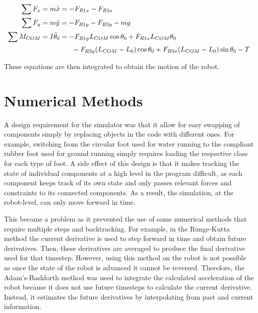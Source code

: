\documentclass[letterpaper]{article}
\begin{document}
\begin{align}
	\sum F_x &= m \ddot{x} = -F_{R1x} - F_{R3x}  \\
	\sum F_y &= m \ddot{y} = -F_{R1y} - F_{R3y} - mg \\
	\sum M_{COM} &= I \ddot{\theta}_0 = -F_{R1y} L_{COM} \cos \theta_0 + F_{R1x} L_{COM} \theta_0 \notag \\
		& \phantom{I \ddot{\theta}_0 =} \qquad - F_{R3y} (L_{COM} - L_0) \cos \theta_0 + F_{R3x} (L_{COM} - L_0) \sin \theta_0 - T
\end{align}

\noindent These equations are then integrated to obtain the motion of the robot.

\section{Numerical Methods}

A design requirement for the simulator was that it allow for easy swapping of components simply by replacing objects in the code with different ones. For example, switching from the circular foot used for water running to the compliant rubber foot used for ground running simply requires loading the respective class for each type of foot. A side effect of this design is that it makes tracking the state of individual components at a high level in the program difficult, as each component keeps track of its own state and only passes relevant forces and constraints to its connected components. As a result, the simulation, at the robot-level, can only move forward in time.

This became a problem as it prevented the use of some numerical methods that require multiple steps and backtracking. For example, in the Runge-Kutta method the current derivative is used to step forward in time and obtain future derivatives. Then, these derivatives are averaged to produce the final derivative used for that timestep. However, using this method on the robot is not possible as once the state of the robot is advanced it cannot be reversed. Therefore, the Adam's-Bashforth method was used to integrate the calculated acceleration of the robot because it does not use future timesteps to calculate the current derivative. Instead, it estimates the future derivatives by interpolating from past and current information.
\end{document}
